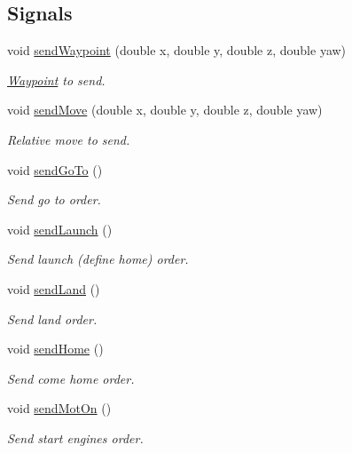 \subsection*{Signals}
\begin{DoxyCompactItemize}
\item 
void \hyperlink{class_communication_control_a80599eb481b0654c13aed69b80e49110}{send\-Waypoint} (double x, double y, double z, double yaw)
\begin{DoxyCompactList}\small\item\em \hyperlink{class_waypoint}{Waypoint} to send. \end{DoxyCompactList}\item 
void \hyperlink{class_communication_control_a5cef76265bbc899f19b866cf57b7180f}{send\-Move} (double x, double y, double z, double yaw)
\begin{DoxyCompactList}\small\item\em Relative move to send. \end{DoxyCompactList}\item 
void \hyperlink{class_communication_control_a83da5b9e8dea359d5858119c2b000236}{send\-Go\-To} ()
\begin{DoxyCompactList}\small\item\em Send go to order. \end{DoxyCompactList}\item 
void \hyperlink{class_communication_control_ae84682b61cb1ad4949dd8cd7e71f8358}{send\-Launch} ()
\begin{DoxyCompactList}\small\item\em Send launch (define home) order. \end{DoxyCompactList}\item 
void \hyperlink{class_communication_control_af3e4f1c2010d8e9808efc7cd9143eff4}{send\-Land} ()
\begin{DoxyCompactList}\small\item\em Send land order. \end{DoxyCompactList}\item 
void \hyperlink{class_communication_control_a10ee54e956ed547e458169e4ac3dba24}{send\-Home} ()
\begin{DoxyCompactList}\small\item\em Send come home order. \end{DoxyCompactList}\item 
void \hyperlink{class_communication_control_a919607401613290c2074e93e1d619bd6}{send\-Mot\-On} ()
\begin{DoxyCompactList}\small\item\em Send start engines order. \end{DoxyCompactList}\item 

\end{DoxyCompactItemize}

